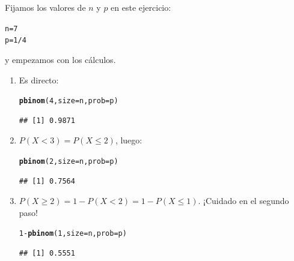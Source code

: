 \documentclass[10pt,a4paper]{article}\usepackage[]{graphicx}\usepackage[]{color}
\makeatletter
\newcommand{\hlnum}[1]{\textcolor[rgb]{0.686,0.059,0.569}{#1}}%
\newcommand{\hlopt}[1]{\textcolor[rgb]{0,0,0}{#1}}%
\newcommand{\hlstd}[1]{\textcolor[rgb]{0.345,0.345,0.345}{#1}}%
\newcommand{\hlkwb}[1]{\textcolor[rgb]{0.69,0.353,0.396}{#1}}%
\newcommand{\hlkwc}[1]{\textcolor[rgb]{0.333,0.667,0.333}{#1}}%
\newcommand{\hlkwd}[1]{\textcolor[rgb]{0.737,0.353,0.396}{\textbf{#1}}}%
\newenvironment{kframe}{%
 \def\at@end@of@kframe{}%
 \ifinner\ifhmode%
  \def\at@end@of@kframe{\end{minipage}}%
  \begin{minipage}{\columnwidth}%
 \fi\fi%
 \def\FrameCommand##1{\hskip\@totalleftmargin \hskip-\fboxsep
 \colorbox{shadecolor}{##1}\hskip-\fboxsep
     \hskip-\linewidth \hskip-\@totalleftmargin \hskip\columnwidth}%
 \MakeFramed {\advance\hsize-\width
   \@totalleftmargin\z@ \linewidth\hsize
   \@setminipage}}%
 {\par\unskip\endMakeFramed%
 \at@end@of@kframe}
\newenvironment{knitrout}{}{} %
\makeatother
\begin{document}
Fijamos los valores de $n$ y $p$ en este ejercicio:
\begin{knitrout}
\color{fgcolor}\begin{kframe}
\begin{alltt}
\hlstd{n} \hlkwb{=} \hlnum{7}
\hlstd{p} \hlkwb{=} \hlnum{1}\hlopt{/}\hlnum{4}
\end{alltt}
\end{kframe}
\end{knitrout}
y empezamos con los cálculos.
\begin{enumerate}
  \item Es directo:
\begin{knitrout}
\color{fgcolor}\begin{kframe}
\begin{alltt}
\hlkwd{pbinom}\hlstd{(}\hlnum{4}\hlstd{,} \hlkwc{size} \hlstd{= n,} \hlkwc{prob} \hlstd{= p)}
\end{alltt}
\begin{verbatim}
## [1] 0.9871
\end{verbatim}
\end{kframe}
\end{knitrout}
  \item $P(X<3) = P(X\leq 2)$, luego:
\begin{knitrout}
\color{fgcolor}\begin{kframe}
\begin{alltt}
\hlkwd{pbinom}\hlstd{(}\hlnum{2}\hlstd{,} \hlkwc{size} \hlstd{= n,} \hlkwc{prob} \hlstd{= p)}
\end{alltt}
\begin{verbatim}
## [1] 0.7564
\end{verbatim}
\end{kframe}
\end{knitrout}
  \item $P(X\geq 2) = 1- P(X<2) = 1- P(X\leq 1)$. ¡Cuidado en el segundo paso!
\begin{knitrout}
\color{fgcolor}\begin{kframe}
\begin{alltt}
\hlnum{1}\hlopt{-} \hlkwd{pbinom}\hlstd{(}\hlnum{1}\hlstd{,} \hlkwc{size} \hlstd{= n,} \hlkwc{prob} \hlstd{= p)}
\end{alltt}
\begin{verbatim}
## [1] 0.5551
\end{verbatim}

\end{kframe}
\end{knitrout}
\end{enumerate}
\end{document}
